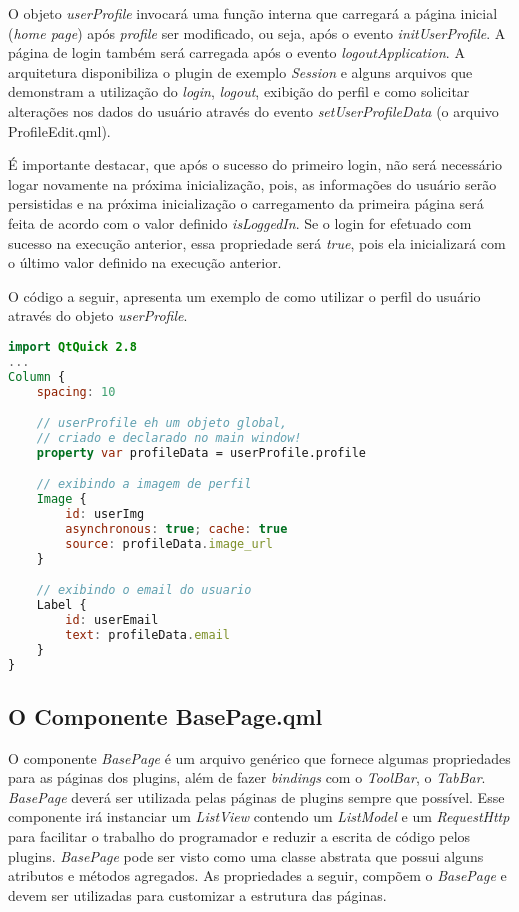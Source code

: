 O objeto \textit{userProfile} invocará uma função interna que carregará a página inicial (\textit{home page}) após \textit{profile} ser modificado, ou seja, após o evento \textit{initUserProfile}. A página de login também será carregada após o evento \textit{logoutApplication}. A arquitetura disponibiliza o plugin de exemplo \textit{Session} e alguns arquivos que demonstram a utilização do \textit{login}, \textit{logout}, exibição do perfil e como solicitar alterações nos dados do usuário através do evento \textit{setUserProfileData} (o arquivo ProfileEdit.qml).\par

É importante destacar, que após o sucesso do primeiro login, não será necessário logar novamente na próxima inicialização, pois, as informações do usuário serão persistidas e na próxima inicialização o carregamento da primeira página será feita de acordo com o valor definido \textit{isLoggedIn}. Se o login for efetuado com sucesso na execução anterior, essa propriedade será \textit{true}, pois ela inicializará com o último valor definido na execução anterior.\par

O código a seguir, apresenta um exemplo de como utilizar o perfil do usuário através do objeto \textit{userProfile}.

\begin{center}
\begin{lstlisting}[language=qml]
import QtQuick 2.8
...
Column {
	spacing: 10

	// userProfile eh um objeto global,
	// criado e declarado no main window!
	property var profileData = userProfile.profile

	// exibindo a imagem de perfil
	Image {
		id: userImg
		asynchronous: true; cache: true
		source: profileData.image_url
	}

	// exibindo o email do usuario
	Label {
		id: userEmail
		text: profileData.email
	}
}
\end{lstlisting}
\end{center}


\subsection{O Componente BasePage.qml}\label{sec:solucao-desenvolvida}
O componente \textit{BasePage} é um arquivo genérico que fornece algumas propriedades para as páginas dos plugins, além de fazer \textit{bindings} com o \textit{ToolBar}, o \textit{TabBar}. \textit{BasePage} deverá ser utilizada pelas páginas de plugins sempre que possível. Esse componente irá instanciar um \textit{ListView} contendo um \textit{ListModel} e um \textit{RequestHttp} para facilitar o trabalho do programador e reduzir a escrita de código pelos plugins. \textit{BasePage} pode ser visto como uma classe abstrata que possui alguns atributos e métodos agregados. As propriedades a seguir, compõem o \textit{BasePage} e devem ser utilizadas para customizar a estrutura das páginas.

